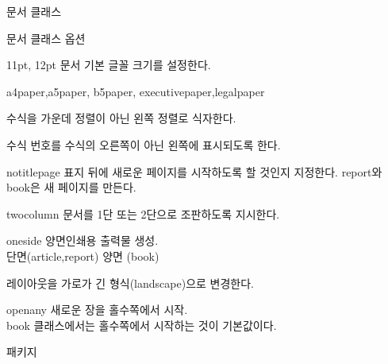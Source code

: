 \documentclass[ aspectratio=149,  10pt,blue,xcolor=pdftex,dvipsnames,table,handout,notes]{beamer}
\begin{document}
		\begin{frame}[t,shrink=0]{문서 클래스}


			\begin{block} {문서 클래스 옵션}
			\begin{description}[1234567890]
			\item [10pt] 11pt, 12pt 문서 기본 글꼴 크기를 설정한다.
			\item [letterpaper] a4paper,a5paper, b5paper, executivepaper,legalpaper
			\item [fleqn] 수식을 가운데 정렬이 아닌 왼쪽 정렬로 식자한다.
			\item [leqno] 수식 번호를 수식의 오른쪽이 아닌 왼쪽에 표시되도록 한다.
			\item [titlepage] notitlepage 표지 뒤에 새로운 페이지를 시작하도록 할 것인지 지정한다. report와 book은 새 페이지를 만든다.
			\item [onecolumn] twocolumn 문서를 1단 또는 2단으로 조판하도록 지시한다.
			\item [twoside] oneside 양면인쇄용 출력물 생성.\\ 단면(article,report) 양면 (book)
			\item [landscape] 레이아웃을 가로가 긴 형식(landscape)으로 변경한다.
			\item [openright] openany 새로운 장을 홀수쪽에서 시작.\\
								book 클래스에서는 홀수쪽에서 시작하는 것이 기본값이다.
			\end{description}
			\end{block}



		\note[item]{}
		\end{frame}



		\begin{frame}[t]{패키지}

		\end{frame}
\end{document}

